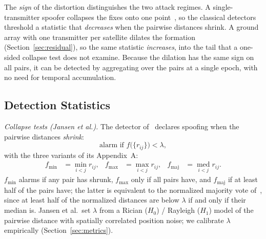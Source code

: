 \documentclass[conference]{IEEEtran}
\begin{document}
The \emph{sign} of the distortion distinguishes the two attack regimes.
A single-transmitter spoofer collapses the fixes onto one
point~\cite[Result~1]{tippenhauer2011requirements}, so the classical
detectors threshold a statistic that \emph{decreases} when the pairwise
distances shrink. A ground array with one transmitter per satellite
dilates the formation (Section~\ref{sec:residual}), so the same
statistic \emph{increases}, into the tail that a one-sided collapse test
does not examine. Because the dilation has the same sign on all pairs,
it can be detected by aggregating over the pairs at a single epoch, with
no need for temporal accumulation.

\subsection{Detection Statistics}
\emph{Collapse tests (Jansen et al.).}
The detector of~\cite{jansen2016multireceiver} declares spoofing when the
pairwise distances \emph{shrink}:
\begin{equation}
\text{alarm if } f\bigl(\{r_{ij}\}\bigr)<\lambda ,
\label{eq:jansen}
\end{equation}
with the three variants of its Appendix~A:
\begin{align}
f_{\min}  &= \min_{i<j} r_{ij}, &
f_{\max}  &= \max_{i<j} r_{ij}, &
f_{\mathrm{maj}} &= \operatorname*{med}_{i<j} r_{ij}.
\label{eq:variants}
\end{align}
$f_{\min}$ alarms if any pair has shrunk, $f_{\max}$ only if all pairs
have, and $f_{\mathrm{maj}}$ if at least half of the pairs have; the
latter is equivalent to the normalized majority vote
of~\cite{jansen2016multireceiver}, since at least half of the normalized
distances are below $\lambda$ if and only if their median is. Jansen et
al.\ set $\lambda$ from a Rician ($H_0$) / Rayleigh ($H_1$) model of the
pairwise distance with spatially correlated position noise; we calibrate
$\lambda$ empirically (Section~\ref{sec:metrics}).
\end{document}
